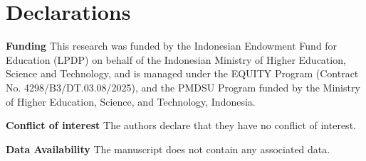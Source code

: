 \documentclass[pdflatex,sn-mathphys-num]{sn-jnl}
\theoremstyle{thmstyleone}%
\theoremstyle{thmstyletwo}%
\theoremstyle{thmstylethree}%
\begin{document}

\section*{Declarations}

\textbf{Funding} This research was funded by the Indonesian Endowment Fund for Education (LPDP)
on behalf of the Indonesian Ministry of Higher Education, Science and Technology,
and is managed under the EQUITY Program (Contract No. 4298/B3/DT.03.08/2025), and the PMDSU Program funded by the Ministry of Higher Education, Science, and Technology, Indonesia.


\medskip
\noindent
\textbf{Conflict of interest} The authors declare that they have no conflict of interest.

\medskip
\noindent
\textbf{Data Availability} The manuscript does not contain any associated data.







%
\end{document}
